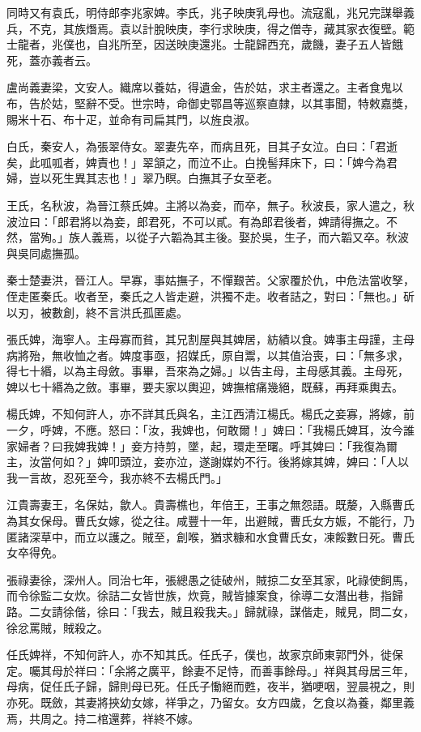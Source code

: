 \begin{pinyinscope}
同時又有袁氏，明侍郎李兆家婢。李氏，兆子映庚乳母也。流寇亂，兆兄完謀舉義兵，不克，其族熸焉。袁以計脫映庚，李行求映庚，得之僧寺，藏其家衣復壁。範士龍者，兆僕也，自兆所至，因送映庚還兆。士龍歸西充，歲饑，妻子五人皆餓死，蓋亦義者云。

盧尚義妻梁，文安人。織席以養姑，得遺金，告於姑，求主者還之。主者食鬼以布，告於姑，堅辭不受。世宗時，命御史鄂昌等巡察直隸，以其事聞，特敕嘉獎，賜米十石、布十疋，並命有司扁其門，以旌良淑。

白氏，秦安人，為張翠侍女。翠妻先卒，而病且死，目其子女泣。白曰：「君逝矣，此呱呱者，婢責也！」翠頷之，而泣不止。白挽髻拜床下，曰：「婢今為君婦，豈以死生異其志也！」翠乃瞑。白撫其子女至老。

王氏，名秋波，為晉江蔡氏婢。主將以為妾，而卒，無子。秋波長，家人遣之，秋波泣曰：「郎君將以為妾，郎君死，不可以貳。有為郎君後者，婢請得撫之。不然，當殉。」族人義焉，以從子六韜為其主後。娶於吳，生子，而六韜又卒。秋波與吳同處撫孤。

秦士楚妻洪，晉江人。早寡，事姑撫子，不憚艱苦。父家覆於仇，中危法當收孥，侄走匿秦氏。收者至，秦氏之人皆走避，洪獨不走。收者詰之，對曰：「無也。」斫以刃，被數創，終不言洪氏孤匿處。

張氏婢，海寧人。主母寡而貧，其兄割屋與其婢居，紡績以食。婢事主母謹，主母病將殆，無收恤之者。婢度事亟，招媒氏，原自鬻，以其值治喪，曰：「無多求，得七十緡，以為主母斂。事畢，吾來為之婦。」以告主母，主母感其義。主母死，婢以七十緡為之斂。事畢，要夫家以輿迎，婢撫棺痛幾絕，既蘇，再拜乘輿去。

楊氏婢，不知何許人，亦不詳其氏與名，主江西清江楊氏。楊氏之妾寡，將嫁，前一夕，呼婢，不應。怒曰：「汝，我婢也，何敢爾！」婢曰：「我楊氏婢耳，汝今誰家婦者？曰我婢我婢！」妾方持剪，墜，起，環走至曙。呼其婢曰：「我復為爾主，汝當何如？」婢叩頭泣，妾亦泣，遂謝媒妁不行。後將嫁其婢，婢曰：「人以我一言故，忍死至今，我亦終不去楊氏門。」

江貴壽妻王，名保姑，歙人。貴壽樵也，年倍王，王事之無怨語。既嫠，入縣曹氏為其女保母。曹氏女嫁，從之往。咸豐十一年，出避賊，曹氏女方娠，不能行，乃匿諸深草中，而立以護之。賊至，創喉，猶求糠和水食曹氏女，凍餒數日死。曹氏女卒得免。

張祿妻徐，深州人。同治七年，張總愚之徒破州，賊掠二女至其家，叱祿使飼馬，而令徐監二女炊。徐詰二女皆世族，炊竟，賊皆據案食，徐導二女潛出巷，指歸路。二女請徐偕，徐曰：「我去，賊且殺我夫。」歸就祿，謀偕走，賊見，問二女，徐忿罵賊，賊殺之。

任氏婢祥，不知何許人，亦不知其氏。任氏子，僕也，故家京師東郭門外，徙保定。囑其母於祥曰：「余將之廣平，餘妻不足恃，而善事餘母。」祥與其母居三年，母病，促任氏子歸，歸則母已死。任氏子慟絕而甦，夜半，猶哽咽，翌晨視之，則亦死。既斂，其妻將挾幼女嫁，祥爭之，乃留女。女方四歲，乞食以為養，鄰里義焉，共周之。持二棺還葬，祥終不嫁。


\end{pinyinscope}
